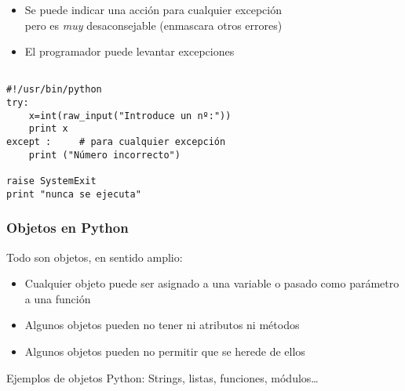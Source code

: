 \begin{frame}[fragile]

\begin{itemize}
\item Se puede indicar una acción para cualquier excepción\\
      pero es \emph{muy} desaconsejable (enmascara otros errores)
\item  El programador puede levantar excepciones
\end{itemize}

  \begin{footnotesize}
\begin{verbatim}

#!/usr/bin/python
try:
    x=int(raw_input("Introduce un nº:"))
    print x
except :     # para cualquier excepción
    print ("Número incorrecto")

raise SystemExit
print "nunca se ejecuta"
\end{verbatim}
  \end{footnotesize}


\end{frame}









\begin{frame}
\frametitle{Objetos en Python}

Todo son objetos, en sentido amplio:
\begin{itemize}
\item Cualquier objeto puede ser asignado a una variable o pasado como
  parámetro a una función
\item Algunos objetos pueden no tener ni atributos ni métodos
\item Algunos objetos pueden no permitir que se herede de ellos
\end{itemize}

Ejemplos de objetos Python: Strings, listas, funciones, módulos\ldots
\end{frame}


